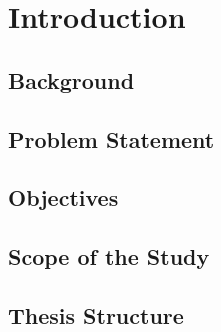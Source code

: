 \chapter{Introduction}

\setcounter{section}{0}
\section{Background}



\section{Problem Statement}

\section{Objectives}

\section{Scope of the Study}

\section{Thesis Structure}



